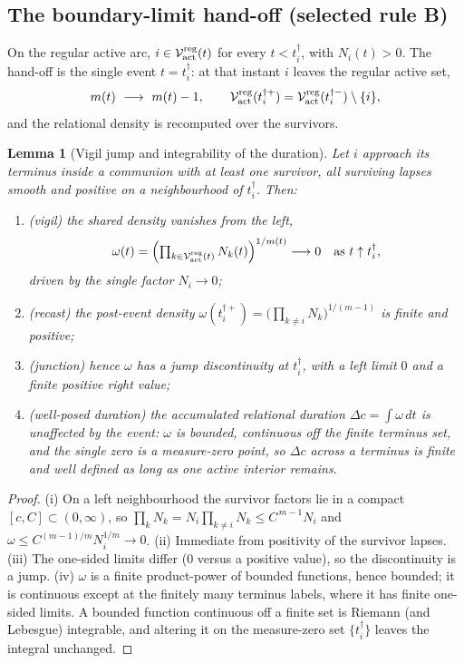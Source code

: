 \documentclass[11pt,a4paper]{article}
\def\mathfrak#1{#1}%
\def\emph#1{#1}%
\theoremstyle{definition}
\theoremstyle{plain}
\newtheorem{lemma}[definition]{Lemma}
\theoremstyle{remark}
\begin{document}
\subsection{The boundary-limit hand-off (selected rule B)}

On the regular active arc, \(i\in\mathcal V_{\rm act}^{\rm reg}(t)\) for every
\(t<t_i^\dagger\), with \(N_i(t)>0\). The hand-off is the single event
\(t=t_i^\dagger\): at that instant \(i\) leaves the regular active set,
\[
m(t)\ \longrightarrow\ m(t)-1,
\qquad
\mathcal V_{\rm act}^{\rm reg}(t_i^{\dagger+})
=\mathcal V_{\rm act}^{\rm reg}(t_i^{\dagger-})\setminus\{i\},
\]
and the relational density is recomputed over the survivors.

\begin{lemma}[Vigil jump and integrability of the duration]\label{lem:handoff}
Let \(i\) approach its terminus inside a communion with at least one survivor, all
surviving lapses smooth and positive on a neighbourhood of \(t_i^\dagger\). Then:
\begin{enumerate}[label=\textup{(\roman*)},leftmargin=1.2cm]
\item \emph{(vigil)} the shared density vanishes from the left,
\[
\omega(t)=\Bigl(\textstyle\prod_{k\in\mathcal V_{\rm act}^{\rm reg}(t)}N_k(t)\Bigr)^{1/m(t)}
\longrightarrow0
\quad\text{as }t\uparrow t_i^\dagger,
\]
driven by the single factor \(N_i\to0\);
\item \emph{(recast)} the post-event density
\(\omega(t_i^{\dagger+})=\bigl(\prod_{k\neq i}N_k\bigr)^{1/(m-1)}\) is finite and
positive;
\item \emph{(junction)} hence \(\omega\) has a jump discontinuity at \(t_i^\dagger\),
with a left limit \(0\) and a finite positive right value;
\item \emph{(well-posed duration)} the accumulated relational duration
\(\Delta\mathfrak c=\int\omega\,dt\) is unaffected by the event: \(\omega\) is bounded,
continuous off the finite terminus set, and the single zero is a measure-zero point, so
\(\Delta\mathfrak c\) across a terminus is finite and well defined as long as one active
interior remains.
\end{enumerate}
\end{lemma}
\begin{proof}
(i) On a left neighbourhood the survivor factors lie in a compact
\([c,C]\subset(0,\infty)\), so \(\prod_k N_k=N_i\prod_{k\neq i}N_k\le C^{\,m-1}N_i\) and
\(\omega\le C^{(m-1)/m}N_i^{1/m}\to0\). (ii) Immediate from positivity of the survivor
lapses. (iii) The one-sided limits differ (\(0\) versus a positive value), so the
discontinuity is a jump. (iv) \(\omega\) is a finite product-power of bounded functions,
hence bounded; it is continuous except at the finitely many terminus labels, where it
has finite one-sided limits. A bounded function continuous off a finite set is Riemann
(and Lebesgue) integrable, and altering it on the measure-zero set \(\{t_i^\dagger\}\)
leaves the integral unchanged. \qedhere
\end{proof}
\end{document}
